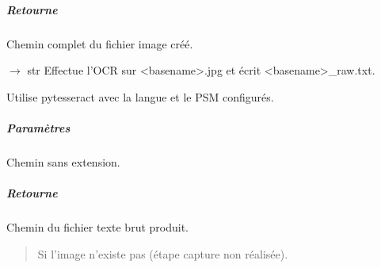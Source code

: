 \documentclass[letterpaper,10pt,french]{sphinxmanual}
\begin{document}
\begin{fulllineitems}
\begin{fulllineitems}
\begin{description}
\end{description}


\subparagraph{Retourne}
\label{\detokenize{api/hardware.devices:retourne}}\begin{description}
\sphinxAtStartPar
Chemin complet du fichier image créé.

\end{description}

\end{fulllineitems}


\begin{fulllineitems}
\label{\detokenize{api/hardware.devices:hardware.devices.text_reader_device.TextReaderDevice.ocr_to_text}}
\pysigstartsignatures
\pysiglinewithargsret
{}
{}
{{ $\rightarrow$ str}}
\pysigstopsignatures
\sphinxAtStartPar
Effectue l’OCR sur \textless{}basename\textgreater{}.jpg et écrit \textless{}basename\textgreater{}\_raw.txt.

\sphinxAtStartPar
Utilise pytesseract avec la langue et le PSM configurés.


\subparagraph{Paramètres}
\label{\detokenize{api/hardware.devices:id9}}\begin{description}
\sphinxAtStartPar
Chemin sans extension.

\end{description}


\subparagraph{Retourne}
\label{\detokenize{api/hardware.devices:id10}}\begin{description}
\sphinxAtStartPar
Chemin du fichier texte brut produit.

\end{description}
\begin{quote}\begin{description}
\sphinxAtStartPar
Si l’image n’existe pas (étape capture non réalisée).

\end{description}\end{quote}

\end{fulllineitems}


\end{fulllineitems}
\end{document}
